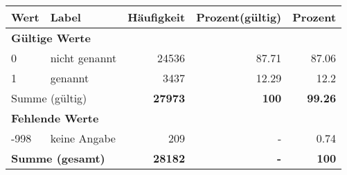      \begin{longtable}{lXrrr}
     \toprule
     \textbf{Wert} & \textbf{Label} & \textbf{Häufigkeit} & \textbf{Prozent(gültig)} & \textbf{Prozent} \\
     \endhead
     \midrule
     \multicolumn{5}{l}{\textbf{Gültige Werte}}\\

     0 &
     \multicolumn{1}{X}{ nicht genannt   } &


       \num{24536} &
       \num[round-mode=places,round-precision=2]{87.71} &
         \num[round-mode=places,round-precision=2]{87.06} \\

     1 &
     \multicolumn{1}{X}{ genannt   } &


       \num{3437} &
       \num[round-mode=places,round-precision=2]{12.29} &
         \num[round-mode=places,round-precision=2]{12.2} \\
     \midrule
     \multicolumn{2}{l}{Summe (gültig)} &
       \textbf{\num{27973}} &
     \textbf{100} &
       \textbf{\num[round-mode=places,round-precision=2]{99.26}} \\
     \multicolumn{5}{l}{\textbf{Fehlende Werte}}\\
       -998 &
       keine Angabe &
         \num{209} &
        - &
         \num[round-mode=places,round-precision=2]{0.74} \\
     \midrule
     \multicolumn{2}{l}{\textbf{Summe (gesamt)}} &
          \textbf{\num{28182}} &
        \textbf{-} &
        \textbf{100} \\
     \bottomrule
     \end{longtable}
     
